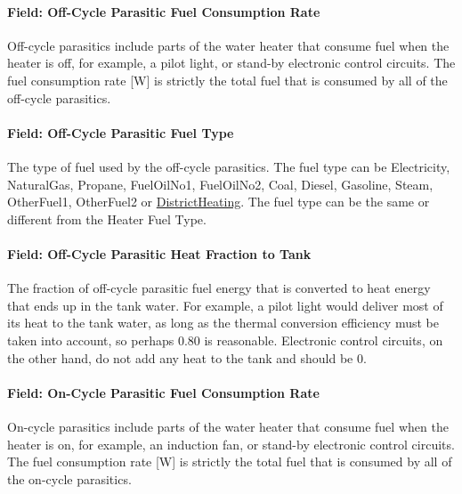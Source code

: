 \paragraph{Field: Off-Cycle Parasitic Fuel Consumption Rate}\label{field-off-cycle-parasitic-fuel-consumption-rate}

Off-cycle parasitics include parts of the water heater that consume fuel when the heater is off, for example, a pilot light, or stand-by electronic control circuits. The fuel consumption rate {[}W{]} is strictly the total fuel that is consumed by all of the off-cycle parasitics.

\paragraph{Field: Off-Cycle Parasitic Fuel Type}\label{field-off-cycle-parasitic-fuel-type}

The type of fuel used by the off-cycle parasitics. The fuel type can be Electricity, NaturalGas, Propane, FuelOilNo1, FuelOilNo2, Coal, Diesel, Gasoline, Steam, OtherFuel1, OtherFuel2 or \hyperref[districtheating]{DistrictHeating}. The fuel type can be the same or different from the Heater Fuel Type.

\paragraph{Field: Off-Cycle Parasitic Heat Fraction to Tank}\label{field-off-cycle-parasitic-heat-fraction-to-tank}

The fraction of off-cycle parasitic fuel energy that is converted to heat energy that ends up in the tank water. For example, a pilot light would deliver most of its heat to the tank water, as long as the thermal conversion efficiency must be taken into account, so perhaps 0.80 is reasonable. Electronic control circuits, on the other hand, do not add any heat to the tank and should be 0.

\paragraph{Field: On-Cycle Parasitic Fuel Consumption Rate}\label{field-on-cycle-parasitic-fuel-consumption-rate}

On-cycle parasitics include parts of the water heater that consume fuel when the heater is on, for example, an induction fan, or stand-by electronic control circuits. The fuel consumption rate {[}W{]} is strictly the total fuel that is consumed by all of the on-cycle parasitics.

